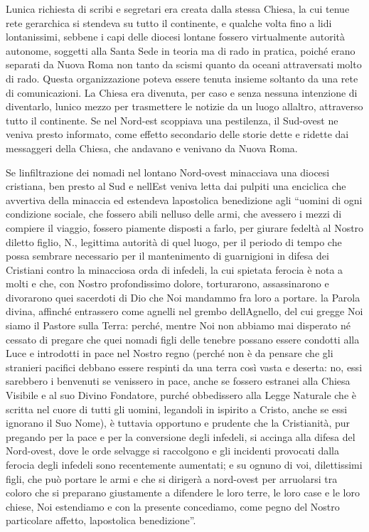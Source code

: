 L\textquotesingle unica richiesta di scribi e segretari era creata dalla
stessa Chiesa, la cui tenue rete gerarchica si stendeva su tutto il
continente, e qualche volta fino a lidi lontanissimi, sebbene i capi
delle diocesi lontane fossero virtualmente autorità autonome, soggetti
alla Santa Sede in teoria ma di rado in pratica, poiché erano separati
da Nuova Roma non tanto da scismi quanto da oceani attraversati molto di
rado. Questa organizzazione poteva essere tenuta insieme soltanto da una
rete di comunicazioni. La Chiesa era divenuta, per caso e senza nessuna
intenzione di diventarlo, l\textquotesingle unico mezzo per trasmettere
le notizie da un luogo all\textquotesingle altro, attraverso tutto il
continente. Se nel Nord-est scoppiava una pestilenza, il Sud-ovest ne
veniva presto informato, come effetto secondario delle storie dette e
ridette dai messaggeri della Chiesa, che andavano e venivano da Nuova
Roma.

Se l\textquotesingle infiltrazione dei nomadi nel lontano Nord-ovest
minacciava una diocesi cristiana, ben presto al Sud e
nell\textquotesingle Est veniva letta dai pulpiti una enciclica che
avvertiva della minaccia ed estendeva l\textquotesingle apostolica
benedizione agli ``uomini di ogni condizione sociale, che fossero abili
nell\textquotesingle uso delle armi, che avessero i mezzi di compiere il
viaggio, fossero piamente disposti a farlo, per giurare fedeltà al
Nostro diletto figlio, N., legittima autorità di quel luogo, per il
periodo di tempo che possa sembrare necessario per il mantenimento di
guarnigioni in difesa dei Cristiani contro la minacciosa orda di
infedeli, la cui spietata ferocia è nota a molti e che, con Nostro
profondissimo dolore, torturarono, assassinarono e divorarono quei
sacerdoti di Dio che Noi mandammo fra loro a portare. la Parola divina,
affinché entrassero come agnelli nel grembo
dell\textquotesingle Agnello, del cui gregge Noi siamo il Pastore sulla
Terra: perché, mentre Noi non abbiamo mai disperato né cessato di
pregare che quei nomadi figli delle tenebre possano essere condotti alla
Luce e introdotti in pace nel Nostro regno (perché non è da pensare che
gli stranieri pacifici debbano essere respinti da una terra così vasta e
deserta: no, essi sarebbero i benvenuti se venissero in pace, anche se
fossero estranei alla Chiesa Visibile e al suo Divino Fondatore, purché
obbedissero alla Legge Naturale che è scritta nel cuore di tutti gli
uomini, legandoli in ispirito a Cristo, anche se essi ignorano il Suo
Nome), è tuttavia opportuno e prudente che la Cristianità, pur pregando
per la pace e per la conversione degli infedeli, si accinga alla difesa
del Nord-ovest, dove le orde selvagge si raccolgono e gli incidenti
provocati dalla ferocia degli infedeli sono recentemente aumentati; e su
ognuno di voi, dilettissimi figli, che può portare le armi e che si
dirigerà a nord-ovest per arruolarsi tra coloro che si preparano
giustamente a difendere le loro terre, le loro case e le loro chiese,
Noi estendiamo e con la presente concediamo, come pegno del Nostro
particolare affetto, l\textquotesingle apostolica benedizione''.

